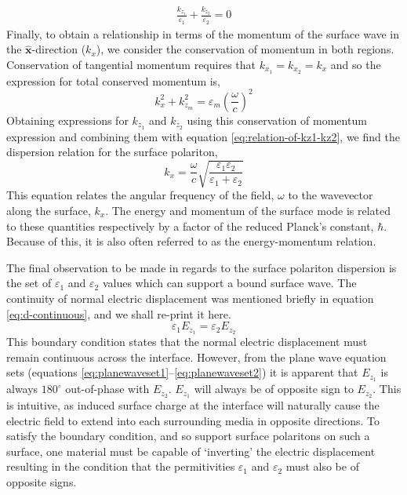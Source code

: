\begin{align}
\frac{k_{z_1}}{\varepsilon_1}+\frac{k_{z_2}}{\varepsilon_2}=0\label{eq:relation-of-kz1-kz2}
\end{align}
Finally, to obtain a relationship in terms of the momentum of the surface wave in the $\mathbf{\hat{x}}$-direction ($k_x$), we consider the conservation of momentum in both regions.  Conservation of tangential momentum  requires that $k_{x_1}=k_{x_2}=k_x$ and so the expression for total conserved momentum is,
\begin{equation}
k_x^2+k_{z_m}^2=\varepsilon_m\left(\frac{\omega}{c}\right)^2\label{eq:momentum-conservation}
\end{equation}
Obtaining expressions for $k_{z_1}$ and $k_{z_2}$ using this conservation of momentum expression and combining them with equation \ref{eq:relation-of-kz1-kz2}, we find the dispersion relation for the surface polariton,
\begin{equation}
k_x=\frac{\omega}{c}\sqrt{\frac{\varepsilon_1\varepsilon_2}{\varepsilon_1+\varepsilon_2}}\label{eq:dispersion}
\end{equation}
This equation relates the angular frequency of the field, $\omega$ to the wavevector along the surface, $k_x$. The energy and momentum of the surface mode is related to these quantities respectively by a factor of the reduced Planck's constant, $\hbar$. Because of this, it is also often referred to as the energy-momentum relation.  

The final observation to be made in regards to the surface polariton dispersion is the set of $\varepsilon_1$ and $\varepsilon_2$ values which can support a bound surface wave. The continuity of normal electric displacement was mentioned briefly in equation \ref{eq:d-continuous}, and we shall re-print it here.
\begin{equation*}
\varepsilon_1E_{z_1}=\varepsilon_2E_{z_2}
\end{equation*}
This boundary condition states that the normal electric displacement must remain continuous across the interface. However, from the plane wave equation sets (equations \ref{eq:planewaveset1}--\ref{eq:planewaveset2}) it is apparent that $E_{z_1}$ is always $180^{\circ}$ out-of-phase with $E_{z_2}$. $E_{z_1}$ will always be of opposite sign to $E_{z_2}$. This is intuitive, as induced surface charge at the interface will naturally cause the electric field to extend into each surrounding media in opposite directions.  To satisfy the boundary condition, and so support surface polaritons on such a surface, one material must be capable of `inverting' the electric displacement resulting in the condition that the permitivities $\varepsilon_1$ and $\varepsilon_2$ must also be of opposite signs. 

